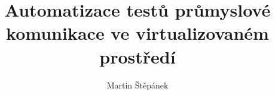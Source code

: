 \documentclass[thesis=M,czech,hidelinks]{template/FITthesis}[2019/12/23]
\title{Automatizace testů průmyslové komunikace ve virtualizovaném prostředí}
\author{Martin Štěpánek} %
\begin{document}


{
    \setlength{\emergencystretch}{3em} 
    \def\UrlBreaks{\do\/\do\-\do\_}
    \printbibliography
}

\appendix


\end{document}

